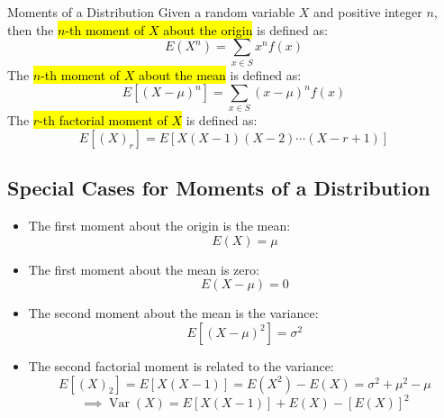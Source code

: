 ﻿\documentclass[12pt]{article}
\begin{document}
\begin{definition}{Moments of a Distribution}
    Given a random variable $X$ and positive integer $n$, then the \hl{$n$-th moment of $X$ about the origin} is defined as:
    \[E(X^n) = \sum_{x \in S} x^n f(x)\]
    The \hl{$n$-th moment of $X$ about the mean} is defined as:
    \[E[(X-\mu)^n] = \sum_{x \in S} (x-\mu)^n f(x)\]
    The \hl{$r$-th factorial moment of $X$} is defined as:
    \[E[(X)_r] = E[X(X-1)(X-2)\cdots(X-r+1)]\]
\end{definition}
\subsection*{Special Cases for Moments of a Distribution}
\begin{itemize}
    \item The first moment about the origin is the mean: \[E(X)=\mu\]
    \item The first moment about the mean is zero: \[E(X-\mu)=0\]
    \item The second moment about the mean is the variance: \[E[(X-\mu)^2]=\sigma^2\]
    \item The second factorial moment is related to the variance: \[E[(X)_2]=E[X(X-1)]=E(X^2)-E(X)=\sigma^2+\mu^2-\mu\]
    \[\boxed{\implies \operatorname{Var}(X) = E[X(X-1)] + E(X) - [E(X)]^2}\] 
\end{itemize}
\end{document}
